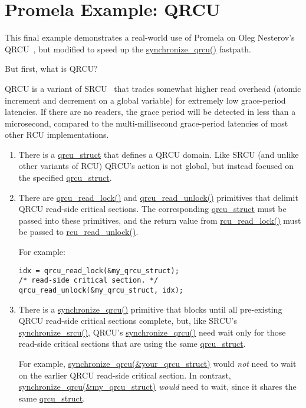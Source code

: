 \section{Promela Example: QRCU}
\label{app:formal:Promela Example: QRCU}

This final example demonstrates a real-world use of Promela on Oleg
Nesterov's
QRCU~\cite{OlegNesterov2007QRCU,OlegNesterov2007aQRCU},
but modified to speed up the \url{synchronize_qrcu()}
fastpath.

But first, what is QRCU?

QRCU is a variant of SRCU~\cite{PaulEMcKenney2006c}
that trades somewhat higher read overhead
(atomic increment and decrement on a global variable) for extremely
low grace-period latencies.
If there are no readers, the grace period will be detected in less
than a microsecond, compared to the multi-millisecond grace-period
latencies of most other RCU implementations.

\begin{enumerate}
\item	There is a \url{qrcu_struct} that defines a QRCU domain.
	Like SRCU (and unlike other variants of RCU) QRCU's action
	is not global, but instead focused on the specified
	\url{qrcu_struct}.
\item	There are \url{qrcu_read_lock()} and \url{qrcu_read_unlock()}
	primitives that delimit QRCU read-side critical sections.
	The corresponding \url{qrcu_struct} must be passed into
	these primitives, and the return value from \url{rcu_read_lock()}
	must be passed to \url{rcu_read_unlock()}.

	For example:

\vspace{5pt}
\begin{minipage}[t]{\columnwidth}
\begin{verbatim}
idx = qrcu_read_lock(&my_qrcu_struct);
/* read-side critical section. */
qrcu_read_unlock(&my_qrcu_struct, idx);
\end{verbatim}
\end{minipage}
\vspace{5pt}

\item	There is a \url{synchronize_qrcu()} primitive that blocks until
	all pre-existing QRCU read-side critical sections complete,
	but, like SRCU's \url{synchronize_srcu()}, QRCU's
	\url{synchronize_qrcu()} need wait only for those read-side
	critical sections that are using the same \url{qrcu_struct}.
	
	For example, \url{synchronize_qrcu(&your_qrcu_struct)}
	would \emph{not} need to wait on the earlier QRCU read-side
	critical section.
	In contrast, \url{synchronize_qrcu(&my_qrcu_struct)}
	\emph{would} need to wait, since it shares the same
	\url{qrcu_struct}.
\end{enumerate}

